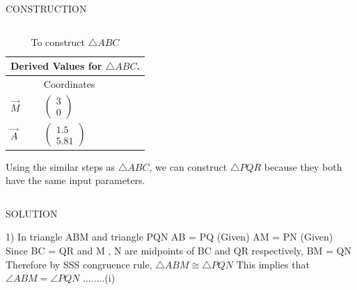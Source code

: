 \documentclass[11pt]{beamer}
\begin{document}
\begin{frame}{CONSTRUCTION}
\begin{columns}
\begin{column}{0.5\textwidth}
\begin{table}[H]
\centering
\resizebox{0.5\textwidth}{!}
{\begin{minipage}{\textwidth}
\begin{tabular}{ |p{1cm}|p{2cm}|  }
\hline
 \multicolumn{2}{|c|}{Derived Values for $\triangle ABC$.} \\
\hline
 & Coordinates \\				
\hline
$\vec{M}$ & $\begin{pmatrix}3\\0\end{pmatrix}$\\				
\hline
$\vec{A}$ & $\begin{pmatrix}1.5\\5.81\end{pmatrix} $\\
\hline
\end{tabular}
\end{minipage}}
\caption{\tiny To construct $\triangle ABC$}
\end{table}
Using the similar steps as $\triangle ABC$, we can construct $\triangle PQR$ because they both have the same input parameters.
\end{column}
\end{columns}

\end{frame}





\begin{frame}{SOLUTION}
    \begin{flushleft}
       
        1) In triangle ABM and triangle PQN
        \newline
        \newline
        AB = PQ  (Given)
        \newline
        AM = PN  (Given)
        \newline
        Since BC = QR and M , N are midpoints of BC and QR respectively, 
        \newline
        BM = QN 
        \newline 
        Therefore by SSS congruence rule, $\triangle  ABM  \cong   \triangle  PQN$ 
        \newline
        \newline
        This implies that $\angle ABM = \angle PQN$    ........(i)

    \end{flushleft}
 

\end{frame}
\end{document}
